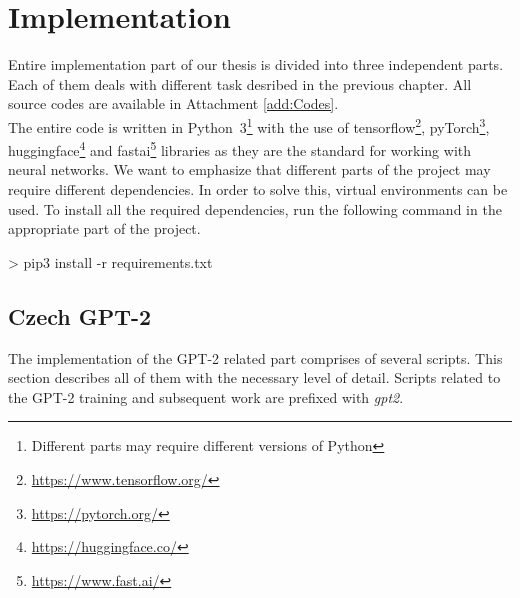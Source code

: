 \chapter{Implementation}
Entire implementation part of our thesis is divided into three independent parts. Each of them deals with different task desribed in the previous chapter. All source codes are available in Attachment \ref{add:Codes}.\\

The entire code is written in Python~3\footnote[1]{Different parts may require different versions of Python} with the use of tensorflow\footnote[2]{\url{https://www.tensorflow.org/}}, pyTorch\footnote[3]{\url{https://pytorch.org/}}, huggingface\footnote[4]{\url{https://huggingface.co/}} and fastai\footnote[5]{\url{https://www.fast.ai/}} libraries as they are the standard for working with neural networks. We want to emphasize that different parts of the project may require different dependencies. In order to solve this, virtual environments can be used. To install all the required dependencies, run the following command in the appropriate part of the project.

\begin{code}
> pip3 install -r requirements.txt
\end{code}

\section{Czech GPT-2}
The implementation of the GPT-2 related part comprises of several scripts. This section describes all of them with the necessary level of detail. Scripts related to the GPT-2 training and subsequent work are prefixed with \textit{gpt2}.

